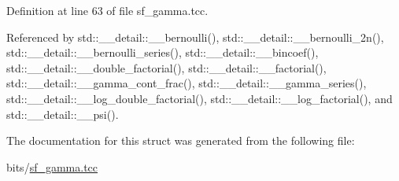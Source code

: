 Definition at line 63 of file sf\+\_\+gamma.\+tcc.



Referenced by std\+::\+\_\+\+\_\+detail\+::\+\_\+\+\_\+bernoulli(), std\+::\+\_\+\+\_\+detail\+::\+\_\+\+\_\+bernoulli\+\_\+2n(), std\+::\+\_\+\+\_\+detail\+::\+\_\+\+\_\+bernoulli\+\_\+series(), std\+::\+\_\+\+\_\+detail\+::\+\_\+\+\_\+bincoef(), std\+::\+\_\+\+\_\+detail\+::\+\_\+\+\_\+double\+\_\+factorial(), std\+::\+\_\+\+\_\+detail\+::\+\_\+\+\_\+factorial(), std\+::\+\_\+\+\_\+detail\+::\+\_\+\+\_\+gamma\+\_\+cont\+\_\+frac(), std\+::\+\_\+\+\_\+detail\+::\+\_\+\+\_\+gamma\+\_\+series(), std\+::\+\_\+\+\_\+detail\+::\+\_\+\+\_\+log\+\_\+double\+\_\+factorial(), std\+::\+\_\+\+\_\+detail\+::\+\_\+\+\_\+log\+\_\+factorial(), and std\+::\+\_\+\+\_\+detail\+::\+\_\+\+\_\+psi().



The documentation for this struct was generated from the following file\+:\begin{DoxyCompactItemize}
\item 
bits/\hyperlink{sf__gamma_8tcc}{sf\+\_\+gamma.\+tcc}\end{DoxyCompactItemize}
